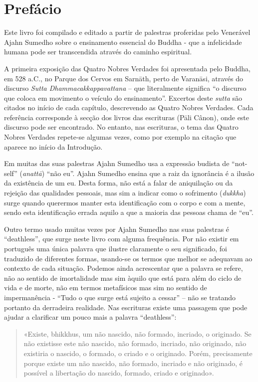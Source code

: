 \chapter{Prefácio}

Este livro foi compilado e editado a partir de palestras proferidas pelo
Venerável Ajahn Sumedho sobre o ensinamento essencial do Buddha - que a
infelicidade humana pode ser transcendida através do caminho espiritual.

A primeira exposição das Quatro Nobres Verdades foi apresentada pelo Buddha, em
528 a.C., no Parque dos Cervos em Sarnāth, perto de Varanāsi, através do
discurso \emph{Sutta Dhammacakkappavattana} – que literalmente
significa “o discurso que coloca em movimento o veículo do ensinamento”.
Excertos deste \emph{sutta} são citados no início de cada capítulo, descrevendo
as Quatro Nobres Verdades. Cada referência corresponde à secção dos livros das
escrituras (Pāli Cânon), onde este discurso pode ser encontrado. No entanto, nas
escrituras, o tema das Quatro Nobres Verdades repete-se algumas vezes, como por
exemplo na citação que aparece no início da Introdução.

Em muitas das suas palestras Ajahn Sumedho usa a expressão budista de “not-self”
(\emph{anattā}) “não eu”. Ajahn Sumedho ensina que a raiz da ignorância é a
ilusão da existência de um eu. Desta forma, não está a falar de aniquilação ou
da rejeição das qualidades pessoais, mas sim a indicar como o sofrimento
(\emph{dukkha}) surge quando querermos manter esta identificação com o corpo e
com a mente, sendo esta identificação errada aquilo a que a maioria das
pessoas chama de “eu”.

Outro termo usado muitas vezes por Ajahn Sumedho nas suas palestras é
“deathless”, que surge neste livro com alguma frequência. Por não existir em
português uma única palavra que ilustre claramente o seu significado, foi
traduzido de diferentes formas, usando-se os termos que melhor se adequavam ao
contexto de cada situação. Podemos ainda acrescentar que a palavra se refere,
não ao sentido de imortalidade mas sim àquilo que está para além do ciclo de
vida e de morte, não em termos metafísicos mas sim no sentido de impermanência -
“Tudo o que surge está sujeito a cessar” – não se tratando portanto da
derradeira realidade. Nas escrituras existe uma passagem que pode ajudar a
clarificar um pouco mais a palavra “deathless”:

\begin{quote}
  «Existe, bhikkhus, um não nascido, não formado, incriado, o originado. 
  Se não existisse este não nascido, não formado, incriado, não
  originado, não existiria o nascido, o formado, o criado e o originado. Porém,
  precisamente porque existe um não nascido, não formado, incriado e não
  originado, é possível a libertação do nascido, formado, criado e originado».

\end{quote}

